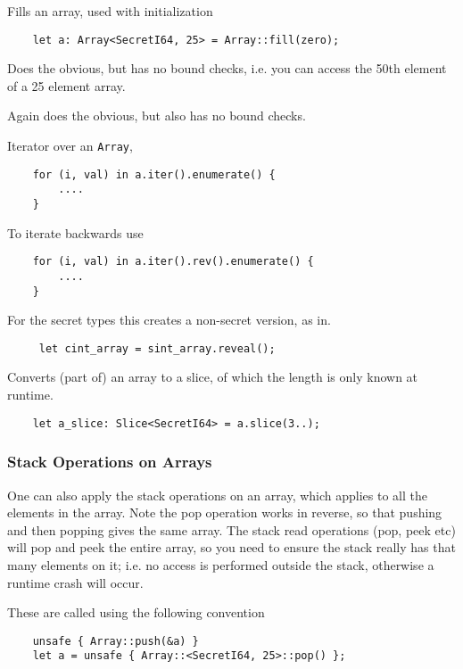Fills an array, used with initialization
\begin{lstlisting}
    let a: Array<SecretI64, 25> = Array::fill(zero);
\end{lstlisting}


Does the obvious, but has no bound checks, i.e. you can access the 50th element of a 25 element array.

Again does the obvious, but also has no bound checks.

Iterator over an \verb|Array|,
\begin{lstlisting}
    for (i, val) in a.iter().enumerate() {
        ....
    }
\end{lstlisting}
To iterate backwards use
\begin{lstlisting}
    for (i, val) in a.iter().rev().enumerate() {
        ....
    }
\end{lstlisting}

For the secret types this creates a non-secret version, as in.
\begin{lstlisting}
     let cint_array = sint_array.reveal();
\end{lstlisting}

Converts (part of) an array to a slice, of which the length is only known at runtime.
\begin{lstlisting}
    let a_slice: Slice<SecretI64> = a.slice(3..);
\end{lstlisting}

\subsubsection{Stack Operations on Arrays}
One can also apply the stack operations on an array, which
applies to all the elements in the array.
Note the pop operation works in reverse, so that pushing and
then popping gives the same array.
The stack read operations (pop, peek etc) will pop and peek
the entire array, so you need to ensure the stack really has
that many elements on it; i.e. no access is performed outside
the stack, otherwise a runtime crash will occur.

These are called using the following convention
\begin{lstlisting}
    unsafe { Array::push(&a) }
    let a = unsafe { Array::<SecretI64, 25>::pop() };
\end{lstlisting}

